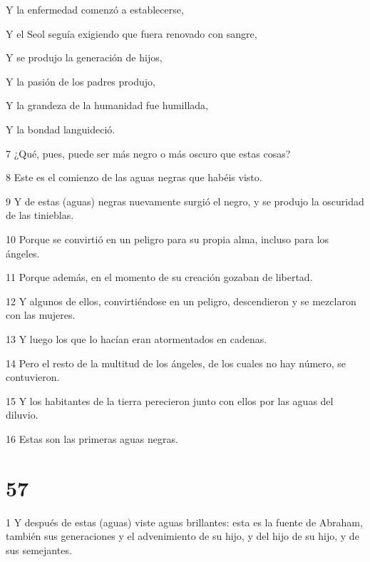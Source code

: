 \par Y la enfermedad comenzó a establecerse,

Y el Seol seguía exigiendo que fuera renovado con sangre,

Y se produjo la generación de hijos,

\par Y la pasión de los padres produjo,

\par Y la grandeza de la humanidad fue humillada,

\par Y la bondad languideció.

\par 7 ¿Qué, pues, puede ser más negro o más oscuro que estas cosas?

\par 8 Este es el comienzo de las aguas negras que habéis visto.

\par 9 Y de estas (aguas) negras nuevamente surgió el negro, y se produjo la oscuridad de las tinieblas.

\par 10 Porque se convirtió en un peligro para su propia alma, incluso para los ángeles.

\par 11 Porque además, en el momento de su creación gozaban de libertad.

\par 12 Y algunos de ellos, convirtiéndose en un peligro, descendieron y se mezclaron con las mujeres.

\par 13 Y luego los que lo hacían eran atormentados en cadenas.

\par 14 Pero el resto de la multitud de los ángeles, de los cuales no hay número, se contuvieron.

\par 15 Y los habitantes de la tierra perecieron junto con ellos por las aguas del diluvio.

\par 16 Estas son las primeras aguas negras.

\chapter{57}

\par 1 Y después de estas (aguas) viste aguas brillantes: esta es la fuente de Abraham, también sus generaciones y el advenimiento de su hijo, y del hijo de su hijo, y de sus semejantes.

